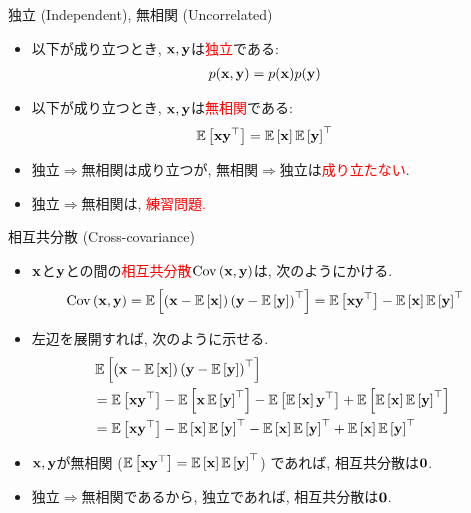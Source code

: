 \documentclass[dvipdfmx,notheorems,t]{beamer}
\begin{document}
\begin{frame}{独立 (Independent), 無相関 (Uncorrelated)}
\begin{itemize}
  \item 以下が成り立つとき, $\vb{x}, \vb{y}$は\textcolor{red}{独立}である:
  \begin{align*}
    p(\vb{x}, \vb{y}) &= p(\vb{x}) p(\vb{y})
  \end{align*}
  \item 以下が成り立つとき, $\vb{x}, \vb{y}$は\textcolor{red}{無相関}である:
  \begin{align*}
    \E{\vb{x} \vb{y}^\top} &= \E{\vb{x}} \E{\vb{y}}^\top
  \end{align*}
  \item 独立$\Rightarrow$無相関は成り立つが, 無相関$\Rightarrow$独立は\textcolor{red}{成り立たない}.
  \item 独立$\Rightarrow$無相関は, \textcolor{red}{練習問題.}
\end{itemize}
\end{frame}

\begin{frame}{相互共分散 (Cross-covariance)}
\begin{itemize}
  \item $\vb{x}$と$\vb{y}$との間の\textcolor{red}{相互共分散}$\Cov{\vb{x}}{\vb{y}}$は, 次のようにかける.
  \begin{align*}
    \Cov{\vb{x}}{\vb{y}}
      = \E{\left( \vb{x} - \E{\vb{x}} \right) \left( \vb{y} - \E{\vb{y}} \right)^\top}
      &= \E{\vb{x} \vb{y}^\top} - \E{\vb{x}} \E{\vb{y}}^\top
  \end{align*}
  \item 左辺を展開すれば, 次のように示せる.
  \begin{align*}
    & \E{\left( \vb{x} - \E{\vb{x}} \right) \left( \vb{y} - \E{\vb{y}} \right)^\top} \\
      &= \E{\vb{x} \vb{y}^\top} - \E{\vb{x} \E{\vb{y}}^\top}
        - \E{\E{\vb{x}} \vb{y}^\top} + \E{\E{\vb{x}} \E{\vb{y}}^\top} \\
      &= \E{\vb{x} \vb{y}^\top} - \E{\vb{x}} \E{\vb{y}}^\top
        - \E{\vb{x}} \E{\vb{y}}^\top + \E{\vb{x}} \E{\vb{y}}^\top
  \end{align*}
  \item $\vb{x}, \vb{y}$が無相関 ($\E{\vb{x} \vb{y}^\top} = \E{\vb{x}} \E{\vb{y}}^\top$) であれば, 相互共分散は$\vb{0}$.
  \item 独立$\Rightarrow$無相関であるから, 独立であれば, 相互共分散は$\vb{0}$.
\end{itemize}
\end{frame}
\end{document}
